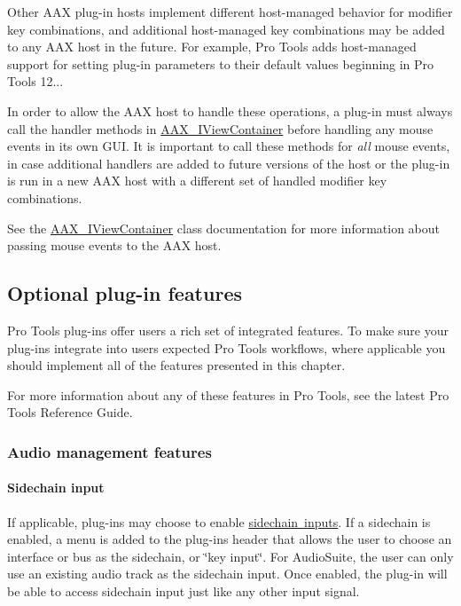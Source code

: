 Other A\+AX plug-\/in hosts implement different host-\/managed behavior for modifier key combinations, and additional host-\/managed key combinations may be added to any A\+AX host in the future. For example, Pro Tools adds host-\/managed support for setting plug-\/in parameters to their default values beginning in Pro Tools 12...

In order to allow the A\+AX host to handle these operations, a plug-\/in must always call the handler methods in \mbox{\hyperlink{a01889}{A\+A\+X\+\_\+\+I\+View\+Container}} before handling any mouse events in its own G\+UI. It is important to call these methods for {\itshape all} mouse events, in case additional handlers are added to future versions of the host or the plug-\/in is run in a new A\+AX host with a different set of handled modifier key combinations.

See the \mbox{\hyperlink{a01889}{A\+A\+X\+\_\+\+I\+View\+Container}} class documentation for more information about passing mouse events to the A\+AX host.



 \hypertarget{a00830_aax_pro_tools_guide_05_optional_plugin_features}{}\subsection{Optional plug-\/in features}\label{a00830_aax_pro_tools_guide_05_optional_plugin_features}
Pro Tools plug-\/ins offer users a rich set of integrated features. To make sure your plug-\/ins integrate into users\textquotesingle{} expected Pro Tools workflows, where applicable you should implement all of the features presented in this chapter.

For more information about any of these features in Pro Tools, see the latest Pro Tools Reference Guide.

\hypertarget{a00830_subsection__audio_management_features}{}\subsubsection{Audio management features}\label{a00830_subsection__audio_management_features}
\hypertarget{a00830_subsubsection__sidechain_input_}{}\paragraph{Sidechain input}\label{a00830_subsubsection__sidechain_input_}
If applicable, plug-\/ins may choose to enable \mbox{\hyperlink{a00808}{sidechain inputs}}. If a sidechain is enabled, a menu is added to the plug-\/in\textquotesingle{}s header that allows the user to choose an interface or bus as the sidechain, or \char`\"{}key input\char`\"{}. For Audio\+Suite, the user can only use an existing audio track as the sidechain input. Once enabled, the plug-\/in will be able to access sidechain input just like any other input signal.

